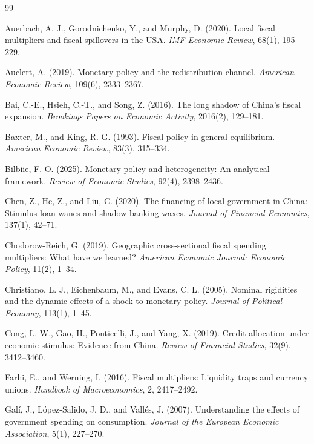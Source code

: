\documentclass[12pt,UTF8]{ctexart}
\begin{document}
	\begin{thebibliography}{99}
		\addtolength{\itemsep}{-0.3em}
		
		Auerbach, A. J., Gorodnichenko, Y., and Murphy, D. (2020). Local fiscal multipliers and fiscal spillovers in the USA. \textit{IMF Economic Review}, 68(1), 195--229.
		
		Auclert, A. (2019). Monetary policy and the redistribution channel. \textit{American Economic Review}, 109(6), 2333--2367.
		
		Bai, C.-E., Hsieh, C.-T., and Song, Z. (2016). The long shadow of China's fiscal expansion. \textit{Brookings Papers on Economic Activity}, 2016(2), 129--181.
		
		Baxter, M., and King, R. G. (1993). Fiscal policy in general equilibrium. \textit{American Economic Review}, 83(3), 315--334.
		
		Bilbiie, F. O. (2025). Monetary policy and heterogeneity: An analytical framework. \textit{Review of Economic Studies}, 92(4), 2398--2436.
		
		Chen, Z., He, Z., and Liu, C. (2020). The financing of local government in China: Stimulus loan wanes and shadow banking waxes. \textit{Journal of Financial Economics}, 137(1), 42--71.
		
		Chodorow-Reich, G. (2019). Geographic cross-sectional fiscal spending multipliers: What have we learned? \textit{American Economic Journal: Economic Policy}, 11(2), 1--34.
		
		Christiano, L. J., Eichenbaum, M., and Evans, C. L. (2005). Nominal rigidities and the dynamic effects of a shock to monetary policy. \textit{Journal of Political Economy}, 113(1), 1--45.
		
		Cong, L. W., Gao, H., Ponticelli, J., and Yang, X. (2019). Credit allocation under economic stimulus: Evidence from China. \textit{Review of Financial Studies}, 32(9), 3412--3460.
		
		Farhi, E., and Werning, I. (2016). Fiscal multipliers: Liquidity traps and currency unions. \textit{Handbook of Macroeconomics}, 2, 2417--2492.
		
		Galí, J., López-Salido, J. D., and Vallés, J. (2007). Understanding the effects of government spending on consumption. \textit{Journal of the European Economic Association}, 5(1), 227--270.
		

\end{thebibliography}
\end{document}
